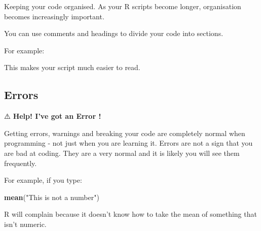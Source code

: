 \documentclass[
]{book}
\newenvironment{Shaded}{\begin{snugshade}}{\end{snugshade}}
\newcommand{\CommentTok}[1]{\textcolor[rgb]{0.56,0.35,0.01}{\textit{#1}}}
\newcommand{\FunctionTok}[1]{\textcolor[rgb]{0.13,0.29,0.53}{\textbf{#1}}}
\newcommand{\NormalTok}[1]{#1}
\newcommand{\OtherTok}[1]{\textcolor[rgb]{0.56,0.35,0.01}{#1}}
\newcommand{\SpecialCharTok}[1]{\textcolor[rgb]{0.81,0.36,0.00}{\textbf{#1}}}
\newcommand{\StringTok}[1]{\textcolor[rgb]{0.31,0.60,0.02}{#1}}
\begin{document}
Keeping your code organised. As your R scripts become longer, organisation becomes increasingly important.

You can use comments and headings to divide your code into sections.

For example:

\begin{Shaded}
\end{Shaded}

This makes your script much easier to read.

\subsection{Errors}\label{errors}

⚠️ \textbf{Help! I've got an Error !}

Getting errors, warnings and breaking your code are completely normal when programming - not just when you are learning it. Errors are not a sign that you are bad at coding. They are a very normal and it is likely you will see them frequently.

For example, if you type:

\begin{Shaded}
\begin{Highlighting}[]
\FunctionTok{mean}\NormalTok{(}\StringTok{"This is not a number"}\NormalTok{)}
\end{Highlighting}
\end{Shaded}

R will complain because it doesn't know how to take the mean of something that isn't numeric.
\end{document}
